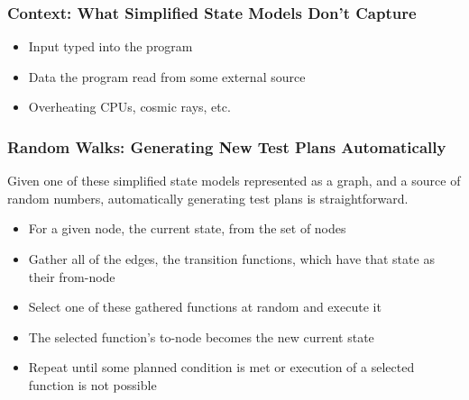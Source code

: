 \begin{frame}
  \frametitle{Context: What Simplified State Models Don't Capture}
  \begin{itemize}
    \item Input typed into the program
    \item Data the program read from some external source
    \item Overheating CPUs, cosmic rays, etc.
  \end{itemize}
\end{frame}


\begin{frame}
  \frametitle{Random Walks: Generating New Test Plans Automatically}
  Given one of these simplified state models represented as a graph, and a source of random numbers, automatically generating test plans is straightforward.
  \begin{itemize}
    \item For a given node, the current state, from the set of nodes
    \item Gather all of the edges, the transition functions, which have that state as their from-node
    \item Select one of these gathered functions at random and execute it
    \item The selected function's to-node becomes the new current state
    \item Repeat until some planned condition is met or execution of a selected function is not possible
  \end{itemize}
\end{frame}

